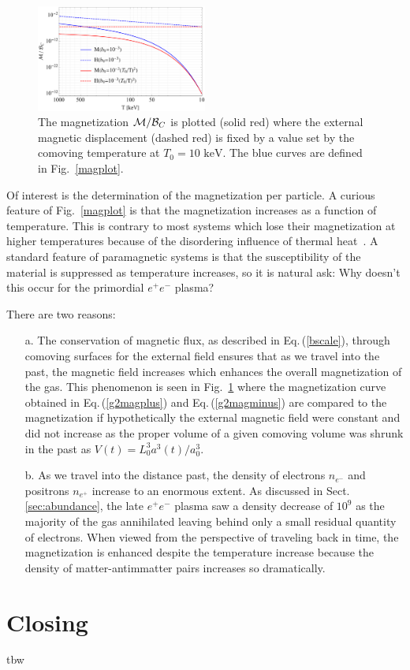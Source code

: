 \documentclass[a4paper]{article}
\newcommand*{\keV}{\text{ keV}}
\newcommand{\req}[1]{Eq.\,(\ref{#1})}
\newcommand{\rf}[1]{Fig.~{\ref{#1}}}
\newcommand{\rsec}[1]{Sect.\,{\ref{#1}}}
\begin{document}
\begin{figure}[ht]
    \centering
    \includegraphics[width=0.5\textwidth]{magfixedplot.pdf}
    \caption{The magnetization ${\cal M}/{\cal B}_{C}$ is plotted (solid red) where the external magnetic displacement (dashed red) is fixed by a value set by the comoving temperature at $T_{0}=10\keV$. The blue curves are defined in \rf{magplot}.}
    \label{magfixedlot} 
\end{figure}
 
Of interest is the determination of the magnetization per particle. A curious feature of \rf{magplot} is that the magnetization increases as a function of temperature. This is contrary to most systems which lose their magnetization at higher temperatures because of the disordering influence of thermal heat~\cite{huang1991statistical}. A standard feature of paramagnetic systems is that the susceptibility of the material is suppressed as temperature increases, so it is natural ask: Why doesn't this occur for the primordial $e^{+}e^{-}$ plasma?

There are two reasons:
\begin{itemize}
    \item[a.] The conservation of magnetic flux, as described in \req{bscale}, through comoving surfaces for the external field ensures that as we travel into the past, the magnetic field increases which enhances the overall magnetization of the gas. This phenomenon is seen in \rf{magfixedlot} where the magnetization curve obtained in \req{g2magplus} and \req{g2magminus} are compared to the magnetization if hypothetically the external magnetic field were constant and did not increase as the proper volume of a given comoving volume was shrunk in the past as $V(t)=L_{0}^{3}a^{3}(t)/a_{0}^{3}$.
    \item[b.] As we travel into the distance past, the density of electrons $n_{e^{-}}$ and positrons $n_{e^{+}}$ increase to an enormous extent. As discussed in \rsec{sec:abundance}, the late $e^{+}e^{-}$ plasma saw a density decrease of $10^{9}$ as the majority of the gas annihilated leaving behind only a small residual quantity of electrons. When viewed from the perspective of traveling back in time, the magnetization is enhanced despite the temperature increase because the density of matter-antimmatter pairs increases so dramatically.
\end{itemize}

\section{Closing}
\label{sec:conclusions}
\noindent tbw



\end{document}
